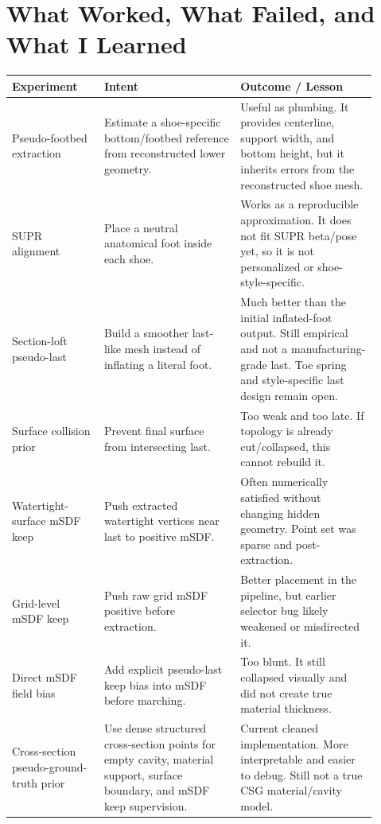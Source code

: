 \documentclass[11pt]{article}
\begin{document}
\section{What Worked, What Failed, and What I Learned}

\begin{longtable}{p{0.23\linewidth}p{0.34\linewidth}p{0.34\linewidth}}
\toprule
\textbf{Experiment} & \textbf{Intent} & \textbf{Outcome / Lesson} \\
\midrule
\endhead
Pseudo-footbed extraction &
Estimate a shoe-specific bottom/footbed reference from reconstructed lower
geometry. &
Useful as plumbing.  It provides centerline, support width, and bottom height,
but it inherits errors from the reconstructed shoe mesh. \\
\midrule
SUPR alignment &
Place a neutral anatomical foot inside each shoe. &
Works as a reproducible approximation.  It does not fit SUPR beta/pose yet, so
it is not personalized or shoe-style-specific. \\
\midrule
Section-loft pseudo-last &
Build a smoother last-like mesh instead of inflating a literal foot. &
Much better than the initial inflated-foot output.  Still empirical and not a
manufacturing-grade last.  Toe spring and style-specific last design remain
open. \\
\midrule
Surface collision prior &
Prevent final surface from intersecting last. &
Too weak and too late.  If topology is already cut/collapsed, this cannot
rebuild it. \\
\midrule
Watertight-surface mSDF keep &
Push extracted watertight vertices near last to positive mSDF. &
Often numerically satisfied without changing hidden geometry.  Point set was
sparse and post-extraction. \\
\midrule
Grid-level mSDF keep &
Push raw grid mSDF positive before extraction. &
Better placement in the pipeline, but earlier selector bug likely weakened or
misdirected it. \\
\midrule
Direct mSDF field bias &
Add explicit pseudo-last keep bias into mSDF before marching. &
Too blunt.  It still collapsed visually and did not create true material
thickness. \\
\midrule
Cross-section pseudo-ground-truth prior &
Use dense structured cross-section points for empty cavity, material support,
surface boundary, and mSDF keep supervision. &
Current cleaned implementation.  More interpretable and easier to debug.  Still
not a true CSG material/cavity model. \\
\bottomrule
\end{longtable}
\end{document}

